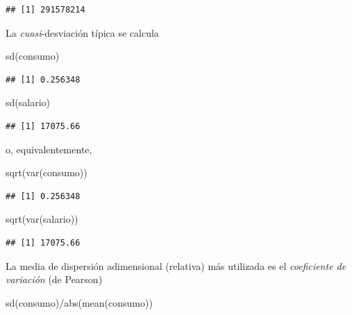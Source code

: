 \documentclass[
]{book}
\newenvironment{Shaded}{\begin{snugshade}}{\end{snugshade}}
\newcommand{\FunctionTok}[1]{\textcolor[rgb]{0.00,0.00,0.00}{#1}}
\newcommand{\NormalTok}[1]{#1}
\newcommand{\SpecialCharTok}[1]{\textcolor[rgb]{0.00,0.00,0.00}{#1}}
\theoremstyle{break}
\begin{document}
\begin{verbatim}
## [1] 291578214
\end{verbatim}

La \emph{cuasi}-desviación típica se calcula

\begin{Shaded}
\begin{Highlighting}[]
\FunctionTok{sd}\NormalTok{(consumo)}
\end{Highlighting}
\end{Shaded}

\begin{verbatim}
## [1] 0.256348
\end{verbatim}

\begin{Shaded}
\begin{Highlighting}[]
\FunctionTok{sd}\NormalTok{(salario)}
\end{Highlighting}
\end{Shaded}

\begin{verbatim}
## [1] 17075.66
\end{verbatim}

o, equivalentemente,

\begin{Shaded}
\begin{Highlighting}[]
\FunctionTok{sqrt}\NormalTok{(}\FunctionTok{var}\NormalTok{(consumo))}
\end{Highlighting}
\end{Shaded}

\begin{verbatim}
## [1] 0.256348
\end{verbatim}

\begin{Shaded}
\begin{Highlighting}[]
\FunctionTok{sqrt}\NormalTok{(}\FunctionTok{var}\NormalTok{(salario))}
\end{Highlighting}
\end{Shaded}

\begin{verbatim}
## [1] 17075.66
\end{verbatim}

La media de dispersión adimensional (relativa) más utilizada
es el \emph{coeficiente de variación} (de Pearson)

\begin{Shaded}
\begin{Highlighting}[]
\FunctionTok{sd}\NormalTok{(consumo)}\SpecialCharTok{/}\FunctionTok{abs}\NormalTok{(}\FunctionTok{mean}\NormalTok{(consumo))}
\end{Highlighting}
\end{Shaded}
\end{document}
